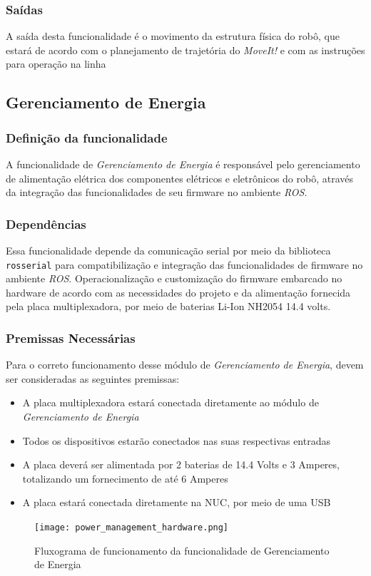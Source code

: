 \subsubsection{Saídas}
A saída desta funcionalidade é o movimento da estrutura física do robô, que estará de acordo com o planejamento de trajetória do \textit{MoveIt!} e com as instruções para operação na linha

\subsection{Gerenciamento de Energia}
\label{ssec:power}
\subsubsection{Definição da funcionalidade}

A funcionalidade de \textit{Gerenciamento de Energia} é responsável pelo gerenciamento de alimentação elétrica dos componentes elétricos e eletrônicos do robô, através da integração das funcionalidades de seu firmware no ambiente \textit{ROS}.
\subsubsection{Dependências}
Essa funcionalidade depende da comunicação serial por meio da biblioteca \verb|rosserial| para compatibilização e integração das funcionalidades de firmware no ambiente \textit{ROS}. Operacionalização e customização do firmware embarcado no hardware de acordo com as necessidades do projeto e da alimentação fornecida pela placa multiplexadora, por meio de baterias Li-Ion NH2054 14.4 volts.

\subsubsection{Premissas Necessárias}
Para o correto funcionamento desse módulo de \textit{Gerenciamento de Energia}, devem ser consideradas as seguintes premissas:
\begin{itemize}
	\item A placa multiplexadora estará conectada diretamente ao módulo de \textit{Gerenciamento de Energia} 
	\item Todos os dispositivos estarão conectados nas suas respectivas entradas
	\item A placa deverá ser alimentada por 2 baterias de 14.4 Volts e 3 Amperes, totalizando um fornecimento de até 6 Amperes
	\item A placa estará conectada diretamente na NUC, por meio de uma USB	
	
\end{itemize}
\begin{figure}[h]
	\centering
	\texttt{[image: power\_management\_hardware.png]}
	\caption{Fluxograma de funcionamento da funcionalidade de Gerenciamento de Energia}
	\label{fig:power_management_hardware}
\end{figure}
